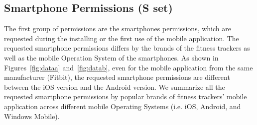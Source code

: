 %		

\subsection{Smartphone Permissions (S set)}
The first group of permissions are the smartphones permissions, which are requested during the installing or the first use of the mobile application. The requested smartphone permissions differs by the brands of the fitness trackers as well as the mobile Operation System of the smartphones. As shown in Figures~\ref{fig:dataa} and~\ref{fig:datab}, even for the mobile application from the same manufacturer (Fitbit), the requested smartphone permissions are different between the iOS version and the Android version. We summarize all the requested smartphone permissions by popular brands of fitness trackers' mobile application across different mobile Operating Systems (i.e. iOS, Android, and Windows Mobile).

